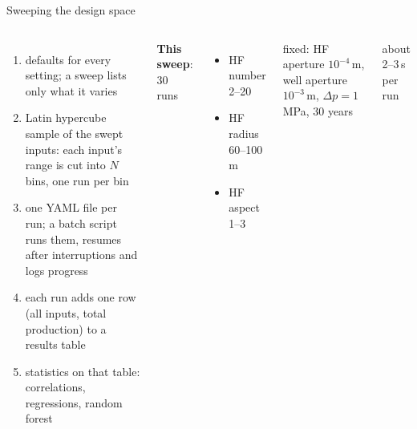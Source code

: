 \documentclass[aspectratio=169,10pt]{beamer}
\begin{document}
\begin{frame}{Sweeping the design space}
\begin{columns}[T]
\begin{enumerate}
  \item defaults for every setting; a sweep lists only what it varies
  \item Latin hypercube sample of the swept inputs: each input's range is cut into $N$ bins, one run per bin
  \item one YAML file per run; a batch script runs them, resumes after interruptions and logs progress
  \item each run adds one row (all inputs, total production) to a results table
  \item statistics on that table: correlations, regressions, random forest
\end{enumerate}
\textbf{This sweep}: 30 runs
\begin{itemize}
  \item HF number 2--20
  \item HF radius 60--100\,m
  \item HF aspect 1--3
\end{itemize}
fixed: HF aperture $10^{-4}$\,m, well aperture $10^{-3}$\,m, $\Delta p = 1$\,MPa, 30 years

\medskip
about 2--3\,s per run
\end{columns}
\end{frame}
\end{document}
